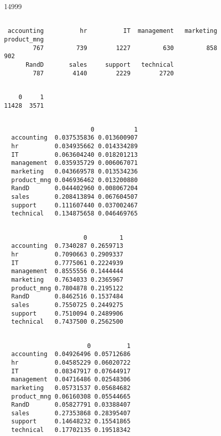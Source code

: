 \documentclass[11pt]{article}
\begin{document}
    14999

    
    
    \begin{verbatim}

 accounting          hr          IT  management   marketing product_mng 
        767         739        1227         630         858         902 
      RandD       sales     support   technical 
        787        4140        2229        2720 
    \end{verbatim}

    
    
    \begin{verbatim}

    0     1 
11428  3571 
    \end{verbatim}

    
    
    \begin{verbatim}
             
                        0           1
  accounting  0.037535836 0.013600907
  hr          0.034935662 0.014334289
  IT          0.063604240 0.018201213
  management  0.035935729 0.006067071
  marketing   0.043669578 0.013534236
  product_mng 0.046936462 0.013200880
  RandD       0.044402960 0.008067204
  sales       0.208413894 0.067604507
  support     0.111607440 0.037002467
  technical   0.134875658 0.046469765
    \end{verbatim}

    
    
    \begin{verbatim}
             
                      0         1
  accounting  0.7340287 0.2659713
  hr          0.7090663 0.2909337
  IT          0.7775061 0.2224939
  management  0.8555556 0.1444444
  marketing   0.7634033 0.2365967
  product_mng 0.7804878 0.2195122
  RandD       0.8462516 0.1537484
  sales       0.7550725 0.2449275
  support     0.7510094 0.2489906
  technical   0.7437500 0.2562500
    \end{verbatim}

    
    
    \begin{verbatim}
             
                       0          1
  accounting  0.04926496 0.05712686
  hr          0.04585229 0.06020722
  IT          0.08347917 0.07644917
  management  0.04716486 0.02548306
  marketing   0.05731537 0.05684682
  product_mng 0.06160308 0.05544665
  RandD       0.05827791 0.03388407
  sales       0.27353868 0.28395407
  support     0.14648232 0.15541865
  technical   0.17702135 0.19518342
    \end{verbatim}
\end{document}
